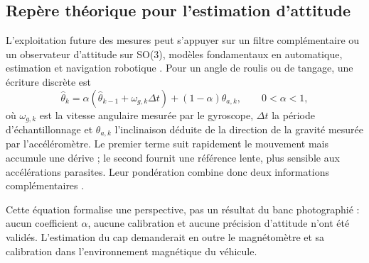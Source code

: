 \subsection{Repère théorique pour l'estimation d'attitude}

L'exploitation future des mesures peut s'appuyer sur un filtre complémentaire ou un observateur d'attitude sur SO(3), modèles fondamentaux en automatique, estimation et navigation robotique \cite{mahony2008nonlinear, madgwick2011estimation}. Pour un angle de roulis ou de tangage, une écriture discrète est
\begin{equation}
  \widehat{\theta}_k =
  \alpha\left(\widehat{\theta}_{k-1}+\omega_{g,k}\Delta t\right)
  +(1-\alpha)\theta_{a,k},
  \qquad 0<\alpha<1,
  \label{eq:complementary-filter}
\end{equation}
où $\omega_{g,k}$ est la vitesse angulaire mesurée par le gyroscope, $\Delta t$ la période d'échantillonnage et $\theta_{a,k}$ l'inclinaison déduite de la direction de la gravité mesurée par l'accéléromètre. Le premier terme suit rapidement le mouvement mais accumule une dérive ; le second fournit une référence lente, plus sensible aux accélérations parasites. Leur pondération combine donc deux informations complémentaires \cite{narkhede-complementary-filter}.

Cette équation formalise une perspective, pas un résultat du banc photographié : aucun coefficient $\alpha$, aucune calibration et aucune précision d'attitude n'ont été validés. L'estimation du cap demanderait en outre le magnétomètre et sa calibration dans l'environnement magnétique du véhicule.
